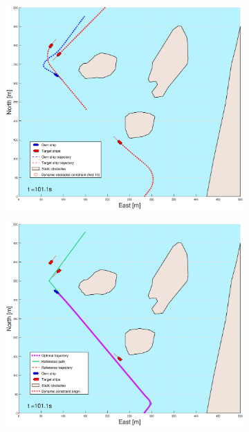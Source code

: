 \begin{figure}[!ht]
\begin{subfigure}[b]{0.499\textwidth}
    \end{subfigure}
    \hfill
    \\
    \begin{subfigure}[b]{0.49\textwidth}
        \centering
        \includegraphics[width=\textwidth]{Images/Figures/Helloya_Rev/_Simple_0fig1_time=101}
    \end{subfigure}
    \hfill
    \begin{subfigure}[b]{0.499\textwidth}
        \centering
        \includegraphics[width=\textwidth]{Images/Figures/Helloya_Rev/_Simple_0fig999_time=101}
    \end{subfigure}
    \hfill
\end{figure}%
